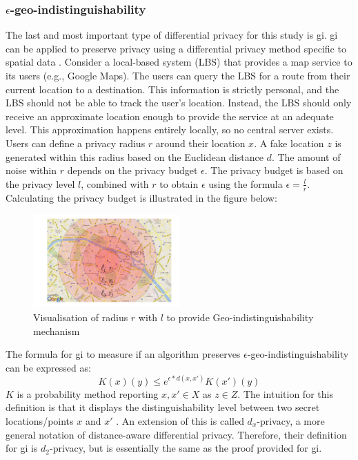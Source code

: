 \subsubsection{$\epsilon$-geo-indistinguishability} \label{theory:geo-indistinguishability}
The last and most important type of differential privacy for this study is \gls{gi}.
\gls{gi} can be applied to preserve privacy using a differential privacy method specific to spatial data \citep{DBLP:journals/corr/abs-1212-1984}.
Consider a local-based system (LBS) that provides a map service to its users (e.g., Google Maps).
The users can query the LBS for a route from their current location to a destination.
This information is strictly personal, and the LBS should not be able to track the user's location.
Instead, the LBS should only receive an approximate location enough to provide the service at an adequate level.
This approximation happens entirely locally, so no central server exists.
\newpage
Users can define a privacy radius $r$ around their location $x$.
A fake location $z$ is generated within this radius based on the Euclidean distance $d$. \newline
The amount of noise within $r$ depends on the privacy budget $\epsilon$.
The privacy budget is based on the privacy level $l$, combined with $r$ to obtain $\epsilon$ using the formula $\epsilon = \frac{l}{r}$. \newline
Calculating the privacy budget is illustrated in the figure below:
\begin{figure}[H]
  \includegraphics[width=0.5\textwidth]{TheorethicalFramework/geo-indistinguishability.png}
  \caption{Visualisation of radius $r$ with $l$ to provide Geo-indistinguishability mechanism \citep{DBLP:journals/corr/abs-1212-1984}}
  \label{fig:geo-indistinguishability}
\end{figure}

The formula for \gls{gi} to measure if an algorithm preserves $\epsilon$-geo-indistinguishability can be expressed as:
\begin{equation}
  K(x)(y) \le e^{\epsilon * d(x,x')} K(x')(y)
  \label{algo:2d-geo-indistinguishability}
\end{equation}
$K$ is a probability method reporting $x, x' \in X$ as $z \in Z$.
The intuition for this definition is that it displays the distinguishability level between two secret locations/points $x$ and $x'$ \citep{chatzikokolakis_constructing_2015}.
An extension of this is called $d_x$-privacy, a more general notation of distance-aware differential privacy.
Therefore, their definition for \gls{gi} is $d_2$-privacy, but is essentially the same as the proof provided for \gls{gi}.
\newpage
